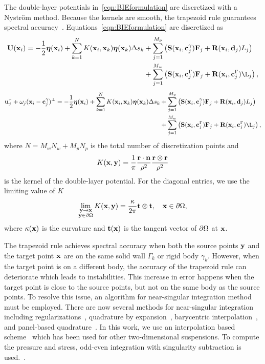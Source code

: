 \documentclass[preprint, 10pt]{elsarticle}
\begin{document}
The double-layer potentials in~\eqref{eqn:BIEformulation} are
discretized with a Nystr\"om method.  Because the kernels are smooth,
the trapezoid rule guarantees spectral accuracy~\cite{Trefethan2014}.
Equations~\eqref{eqn:BIEformulation}  are discretized as
\begin{equation*}
  \begin{aligned}
  \UU(\xx_i) = -\frac{1}{2}\eeta(\xx_i) + 
  \sum_{k=1}^{N} K(\xx_i,\xx_k) \eeta(\xx_k) \Delta s_k
    &+ \sum_{j=1}^{M_p} \left(\mathbf{S}(\xx_i,\cc^\gamma_j)\FF_j +
    \mathbf{R}(\xx_i,\dd_j)L_j\right)  \\
    &+ \sum_{j=1}^{M_w} \left(\mathbf{S}(\xx_i,\cc^\Gamma_j)\FF_j +
    \mathbf{R}(\xx_i,\cc^\Gamma_j)\L_j\right),
  \end{aligned}
\end{equation*}
\begin{equation*}
  \begin{aligned}
\uu^\tau_j + \omega_j(\xx_i - \cc^\gamma_j)^\perp = -\frac{1}{2}\eeta(\xx_i) +
\sum_{k=1}^{N} K(\xx_i,\xx_k) \eeta(\xx_k) \Delta s_k
    &+ \sum_{j=1}^{M_p} \left(\mathbf{S}(\xx_i,\cc^\gamma_j)\FF_j +
    \mathbf{R}(\xx_i,\dd_j)L_j\right)  \\
    &+ \sum_{j=1}^{M_w} \left(\mathbf{S}(\xx_i,\cc^\Gamma_j)\FF_j +
    \mathbf{R}(\xx_i,\cc^\Gamma_j)\L_j\right),
  \end{aligned}
\end{equation*}
where $N = M_w N_w + M_p N_p$ is the total number of discretization
points and
\begin{align*}
  K({\mathbf{x}},{\mathbf{y}}) = \frac{1}{\pi} \frac{{\mathbf{r}} \cdot {\mathbf{n}}}{\rho^2} 
               \frac{{\mathbf{r}} \otimes {\mathbf{r}}}{\rho^2}
\end{align*}
is the kernel of the double-layer potential.
 For the diagonal entries, we use the limiting value of $K$
\begin{align*}
  \lim_{\substack{{\mathbf{y}} \rightarrow {\mathbf{x}} \\ {\mathbf{y}} \in {\partial}\Omega}} 
    K({\mathbf{x}},{\mathbf{y}}) = \frac{\kappa}{2\pi}{\mathbf{t}}\otimes{\mathbf{t}},
    \quad {\mathbf{x}} \in {\partial}\Omega,
\end{align*}
where $\kappa({\mathbf{x}})$ is the curvature and ${\mathbf{t}}({\mathbf{x}})$ is the tangent
vector of ${\partial}\Omega$ at ${\mathbf{x}}$.

The trapezoid rule achieves spectral accuracy when both the source
points ${\mathbf{y}}$ and the target point ${\mathbf{x}}$ are on the same solid wall
$\Gamma_k$ or rigid body $\gamma_k$.  However, when the target point
is on a different body, the accuracy of the trapezoid rule can
deteriorate which leads to instabilities.  This increase in error
happens when the target point is close to the source points, but not on
the same body as the source points.  To resolve this issue, an algorithm
for near-singular integration method must be employed.  There are now
several methods for near-singular integration including
regularizations~\cite{Beale2001}, quadrature by
expansion~\cite{Klockner2013}, barycentric
interpolation~\cite{Barnett2015}, and panel-based
quadrature~\cite{Helsing2008}.  In this work, we use an interpolation
based scheme~\cite{Ying2006} which has been used for other
two-dimensional suspensions.  To compute the pressure and stress, odd-even integration with singularity subtraction is used.~\cite{Quaife2014}.
\end{document}
